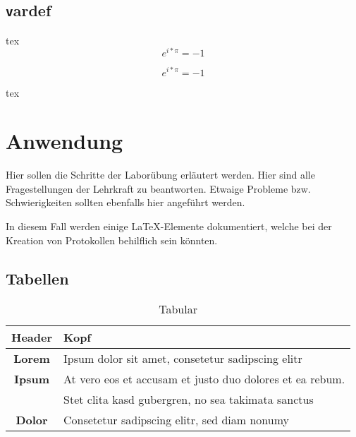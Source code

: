 \subsection{\texttt vardef}
\begin{listing}
\begin{code}{tex}
$$e^{i*\pi} = -1$$
\end{code}

$$e^{i*\pi} = -1$$

\begin{code}[firstnumber=last]{tex}
\begin{vardef}
\end{vardef}
\end{code}

\begin{vardef}
\end{vardef}

\caption{\texttt vardef}
\label{lst:vardef}
\end{listing}

\newpage
\section{Anwendung}\label{sec:Anwendung}
Hier sollen die Schritte der Laborübung erläutert werden. Hier sind alle Fragestellungen der Lehrkraft zu beantworten. Etwaige Probleme bzw. Schwierigkeiten sollten ebenfalls hier angeführt werden.

In diesem Fall werden einige \LaTeX-Elemente dokumentiert, welche bei der Kreation von Protokollen behilflich sein könnten.

\subsection{Tabellen}
\begin{table}[H]
	\center
	\begin{tabular}{| c | l |}
		\hline Header 	& Kopf\\ \hline\hline
		\textbf{Lorem} 	& Ipsum dolor sit amet, consetetur sadipscing elitr\\ \hline
		\textbf{Ipsum} 	& At vero eos et accusam et justo duo dolores et ea rebum.\\
						& Stet clita kasd gubergren, no sea takimata sanctus\\ \hline
		\textbf{Dolor} 	& Consetetur sadipscing elitr, sed diam nonumy\\\hline
	\end{tabular}
	\caption{Tabular}
	\label{tab:tabular}
\end{table}


